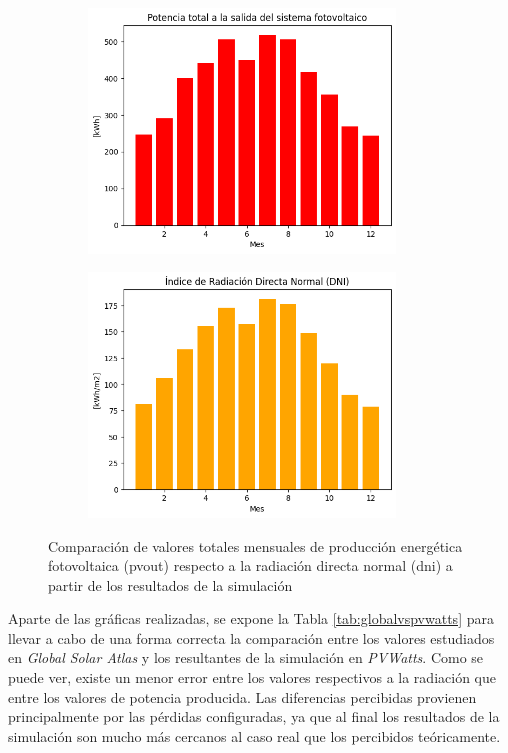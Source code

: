 \begin{figure}[H]
    \centering    
    \begin{subfigure}{0.5\linewidth}
        \centering
        \includegraphics[width=\linewidth,height=6.5cm]{img/diseno/averagepvoutreal.png}
        \label{fig:averagepvoutreal}
    \end{subfigure}\hfill
    \begin{subfigure}{0.5\linewidth}
        \centering
        \includegraphics[width=\linewidth,height=6.5cm]{img/diseno/averagednireal.png}
        \label{fig:averagednireal}
    \end{subfigure}    
    \caption{Comparación de valores totales mensuales de producción energética fotovoltaica (\acrshort{pvout}) respecto a la radiación directa normal (\acrshort{dni}) a partir de los resultados de la simulación}
    \label{fig:averagereal}
\end{figure}

Aparte de las gráficas realizadas, se expone la Tabla \ref{tab:globalvspvwatts} para llevar a cabo de una forma correcta la comparación entre los valores estudiados en \textit{Global Solar Atlas} y los resultantes de la simulación en \textit{PVWatts}. Como se puede ver, existe un menor error entre los valores respectivos a la radiación que entre los valores de potencia producida. Las diferencias percibidas provienen principalmente por las pérdidas configuradas, ya que al final los resultados de la simulación son mucho más cercanos al caso real que los percibidos teóricamente. 

